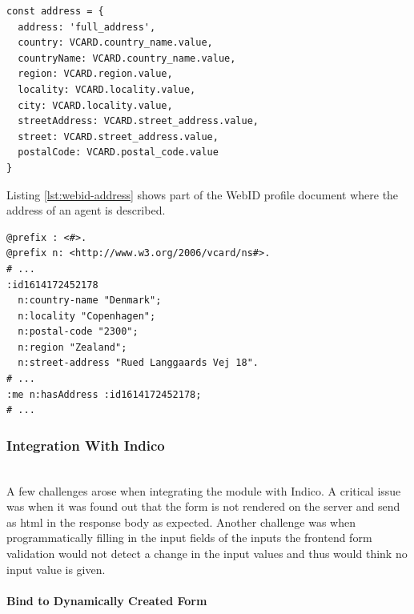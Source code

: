 \begin{lstlisting}[language=Other,columns=fullflexible, caption={Dictionary to map extracted values with predicates from Turtle resource}, label={lst:autocomplete-mapping}]
const address = {
  address: 'full_address',
  country: VCARD.country_name.value,
  countryName: VCARD.country_name.value,
  region: VCARD.region.value,
  locality: VCARD.locality.value,
  city: VCARD.locality.value,
  streetAddress: VCARD.street_address.value,
  street: VCARD.street_address.value,
  postalCode: VCARD.postal_code.value
}
\end{lstlisting}

Listing \ref{lst:webid-address} shows part of the WebID profile document where the address of an agent is described.

\begin{lstlisting}[language=Other,columns=fullflexible, caption={Extraction from WebID profile document showing address.}, label={lst:webid-address}]
@prefix : <#>.
@prefix n: <http://www.w3.org/2006/vcard/ns#>.
# ...
:id1614172452178
  n:country-name "Denmark";
  n:locality "Copenhagen";
  n:postal-code "2300";
  n:region "Zealand";
  n:street-address "Rued Langgaards Vej 18". 
# ...
:me n:hasAddress :id1614172452178;
# ...
\end{lstlisting}

\vspace{0.5cm}
\subsubsection{Integration With Indico}\mbox{}\\

A few challenges arose when integrating the module with Indico. A critical issue was when it was found out that the form is not rendered on the server and send as \gls{html} in the response body as expected. Another challenge was when programmatically filling in the input fields of the inputs the frontend form validation would not detect a change in the input values and thus would think no input value is given.

\vspace{0.5cm}
\paragraph{Bind to Dynamically Created Form}\label{poc2-bind}\mbox{}\\

